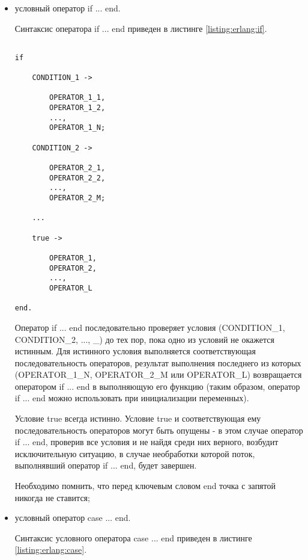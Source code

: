 \begin{itemize}

	\item условный оператор if ... end.

		Синтаксис оператора if ... end приведен в листинге \ref{listing:erlang:if}.

\begin{lstlisting}

if
	
	CONDITION_1 ->

		OPERATOR_1_1,
		OPERATOR_1_2,
		...,
		OPERATOR_1_N;

	CONDITION_2 ->

		OPERATOR_2_1,
		OPERATOR_2_2,
		...,
		OPERATOR_2_M;

	...

	true ->

		OPERATOR_1,
		OPERATOR_2,
		...,
		OPERATOR_L

end.

\end{lstlisting}
\mylistingend

		Оператор if ... end последовательно проверяет условия (CONDITION\_1, CONDITION\_2, ..., \_) до тех пор, пока одно из условий не окажется истинным. Для истинного условия выполняется соответствующая последовательность операторов, результат выполнения последнего из которых (OPERATOR\_1\_N, OPERATOR\_2\_M или OPERATOR\_L) возвращается оператором if ... end в выполняющую его функцию (таким образом, оператор if ... end можно использовать при инициализации переменных).

		Условие true всегда истинно. Условие true и соответствующая ему последовательность операторов могут быть опущены - в этом случае оператор if ... end, проверив все условия и не найдя среди них верного, возбудит исключительную ситуацию, в случае необработки которой поток, выполнявший оператор if ... end, будет завершен.

		Необходимо помнить, что перед ключевым словом end точка с запятой никогда не ставится;

	\item условный оператор case ... end.

		Синтаксис условного оператора case ... end приведен в листинге \ref{listing:erlang:case}.

\begin{lstlisting}


\end{lstlisting}
\end{itemize}
